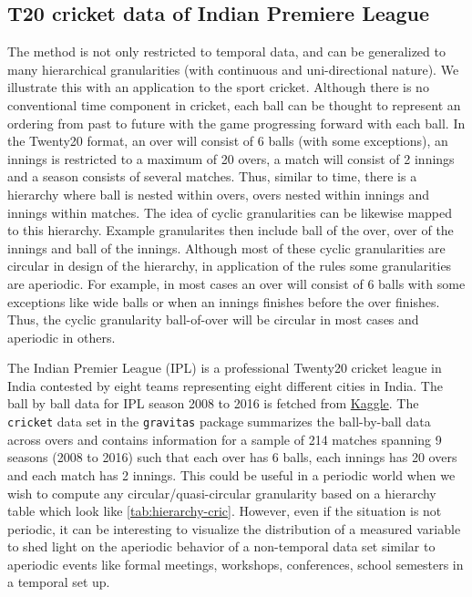 \documentclass[12pt]{article}
\begin{document}
\hypertarget{sec:cricket}{%
\subsection{T20 cricket data of Indian Premiere League}\label{sec:cricket}}

The method is not only restricted to temporal data, and can be generalized to many hierarchical granularities (with continuous and uni-directional nature). We illustrate this with an application to the sport cricket. Although there is no conventional time component in cricket, each ball can be thought to represent an ordering from past to future with the game progressing forward with each ball. In the Twenty20 format, an over will consist of 6 balls (with some exceptions), an innings is restricted to a maximum of 20 overs, a match will consist of 2 innings and a season consists of several matches. Thus, similar to time, there is a hierarchy where ball is nested within overs, overs nested within innings and innings within matches. The idea of cyclic granularities can be likewise mapped to this hierarchy. Example granularites then include ball of the over, over of the innings and ball of the innings. Although most of these cyclic granularities are circular in design of the hierarchy, in application of the rules some granularities are aperiodic. For example, in most cases an over will consist of 6 balls with some exceptions like wide balls or when an innings finishes before the over finishes. Thus, the cyclic granularity ball-of-over will be circular in most cases and aperiodic in others.

\noindent The Indian Premier League (IPL) is a professional Twenty20 cricket league in India contested by eight teams representing eight different cities in India. The ball by ball data for IPL season 2008 to 2016 is fetched from \href{https://www.kaggle.com/josephgpinto/ipl-data-analysis/data}{Kaggle}. The \texttt{cricket} data set in the \texttt{gravitas} package summarizes the ball-by-ball data across overs and contains information for a sample of 214 matches spanning 9 seasons (2008 to 2016) such that each over has 6 balls, each innings has 20 overs and each match has 2 innings. This could be useful in a periodic world when we wish to compute any circular/quasi-circular granularity based on a hierarchy table which look like \autoref{tab:hierarchy-cric}. However, even if the situation is not periodic, it can be interesting to visualize the distribution of a measured variable to shed light on the aperiodic behavior of a non-temporal data set similar to aperiodic events like formal meetings, workshops, conferences, school semesters in a temporal set up.
\end{document}
